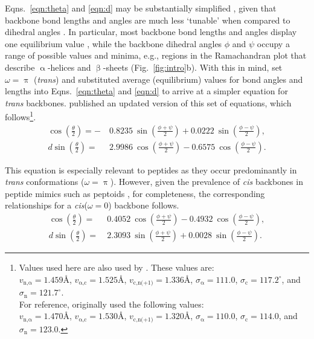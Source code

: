 \documentclass[fleqn,10pt,lineno]{wlpeerj} %
\newcommand{\n}[1]{{\color{blue}#1}}
\newcommand{\Fig}[1]{Fig.~\ref{#1}}
\newcommand{\Eqns}[1]{Eqns.~\ref{#1}}
\newcommand{\cis}{{\em cis}\xspace}
\newcommand{\trans}{{\em trans}\xspace}
\begin{document}
\n{\Eqns{eqn:theta} and \ref{eqn:d} may be substantially simplified \citep{Miyazawa1961}, given that backbone bond lengths and angles are much less `tunable' when compared to dihedral angles \citep{Ramachandran1963,Improta2015,Esposito2013,Improta2015a}. In particular, most backbone bond lengths and angles display one equilibrium value \citep{Improta2015,Esposito2013,Improta2015a}, while the backbone dihedral angles $\phi$ and $\psi$ occupy a range of possible values and minima, e.g., regions in the Ramachandran plot that describe $\upalpha$-helices and $\upbeta$-sheets (\Fig{fig:intro}b). With this in mind, \cite{Miyazawa1961} set $\omega=\uppi$ (\trans) and substituted average (equilibrium) values for bond angles and lengths into \Eqns{eqn:theta} and \ref{eqn:d} to arrive at a simpler equation for \trans backbones. \cite{Zacharias2013} published an updated version of this set of equations, which} follows\footnote{Values used here are also used by \cite{Zacharias2013}. These values are: \\ %
$v_{\textrm{n,}\upalpha} = 1.459\textrm{\AA}$,\hfill
$v_{\upalpha\textrm{,c}} = 1.525\textrm{\AA}$, \hfill
$v_\textrm{c,n(+1)} = 1.336\textrm{\AA}$, \hfill
$\sigma_\upalpha = 111.0$,\hfill
$\sigma_\textrm{c} = 117.2^\circ$, \hfill and \hfill
$\sigma_\textrm{n} = 121.7^\circ$. \hfill \\
For reference, \cite{Miyazawa1961} originally used the following values:\\ 
$v_{\textrm{n,}\upalpha} = 1.470\textrm{\AA}$,\hfill
$v_{\upalpha\textrm{,c}} = 1.530\textrm{\AA}$,\hfill 
$v_\textrm{c,n(+1)} = 1.320\textrm{\AA}$, \hfill
$\sigma_\upalpha = 110.0$,\hfill
$\sigma_\textrm{c} = 114.0$, \hfill and \hfill
$\sigma_\textrm{n} = 123.0$.}.
\begin{align}
\label{eqn:theta_trans}
\cos\left(\frac{\theta}{2}\right) =-&~0.8235~\sin\left(\frac{\phi+\psi}{2}\right) 
                                    +0.0222~\sin\left(\frac{\phi-\psi}{2}\right),\\
\label{eqn:d_trans}
d \sin\left(\frac{\theta}{2}\right) =&~2.9986~\cos\left(\frac{\phi+\psi}{2}\right)
                                      -0.6575~\cos\left(\frac{\phi-\psi}{2}\right).
\end{align}

This equation is especially relevant to peptides as they occur predominantly in \trans conformations ($\omega=\uppi$). However, given the prevalence of \cis backbones in peptide mimics such as peptoids \citep{Mirijanian2014,Gorske2016}, for completeness, \n{the corresponding relationships for a \cis ($\omega=0$) backbone follows.}
\begin{align}
\label{eqn:theta_cis}
\cos\left(\frac{\theta}{2}\right) =&~0.4052~\cos\left(\frac{\phi+\psi}{2}\right)
                                    -0.4932~\cos\left(\frac{\phi-\psi}{2}\right), \\
\label{eqn:d_cis}
d \sin\left(\frac{\theta}{2}\right) = &~2.3093~\sin\left(\frac{\phi+\psi}{2}\right)
                                       +0.0028~\sin\left(\frac{\phi-\psi}{2}\right).
\end{align}
\end{document}
